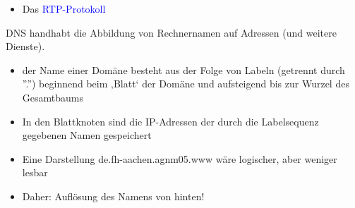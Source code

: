 \begin{itemize}
    \item Das \textcolor{blue}{RTP-Protokoll}
\end{itemize}

DNS handhabt die Abbildung von Rechnernamen auf Adressen (und weitere Dienste).

\begin{itemize}
    \item der Name einer Domäne besteht aus der Folge von Labeln (getrennt durch ''.'') beginnend beim ‚Blatt‘ der Domäne und aufsteigend bis zur Wurzel des Gesamtbaums
    \item In den Blattknoten sind die IP-Adressen der durch die Labelsequenz gegebenen Namen gespeichert
    \item Eine Darstellung de.fh-aachen.agnm05.www wäre logischer, aber weniger lesbar
    \item Daher: Auflösung des Namens von hinten!
\end{itemize}

